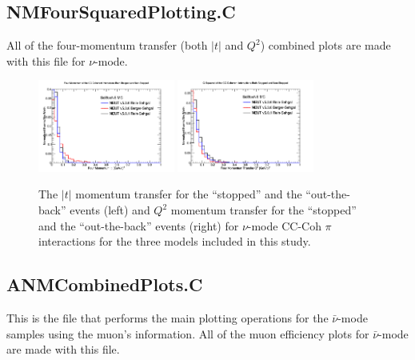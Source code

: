 \documentclass[11pt]{article}
\begin{document}
\subsection{NMFourSquaredPlotting.C}
\label{sub:NMFourSquaredPlotting.C}
All of the four-momentum transfer (both $|t|$ and $Q^2$) combined plots are made with this file for $\nu$-mode.

\begin{figure}[H]
\centering
\includegraphics[width=0.4\textwidth]{CCCohPlots/NMCCCohGoodT.png}
\includegraphics[width=0.4\textwidth]{CCCohPlots/NMCCCohGoodQ2.png}
\caption{The $|t|$ momentum transfer for the ``stopped'' and the ``out-the-back'' events (left) and $Q^2$ momentum transfer for the ``stopped'' and the ``out-the-back'' events (right) for $\nu$-mode CC-Coh $\pi$ interactions for the three models included in this study.}
\label{fig:app:NMTQ2}
\end{figure}

\subsection{ANMCombinedPlots.C}
\label{sub:ANMCombinedPlots.C}
This is the file that performs the main plotting operations for the $\bar{\nu}$-mode samples using the muon's information. All of the muon efficiency plots for $\bar{\nu}$-mode are made with this file.
\end{document}
